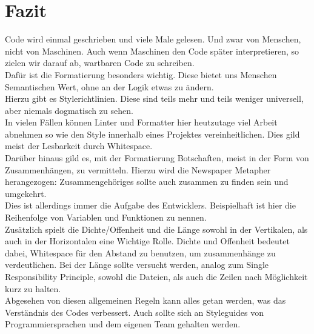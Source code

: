 \section{Fazit}
    Code wird einmal geschrieben und viele Male gelesen.
    Und zwar von Menschen, nicht von Maschinen.
    Auch wenn Maschinen den Code später interpretieren, so zielen wir darauf ab, wartbaren Code zu schreiben.\\
    Dafür ist die Formatierung besonders wichtig.
    Diese bietet uns Menschen Semantischen Wert, ohne an der Logik etwas zu ändern.\\
    Hierzu gibt es Stylerichtlinien.
    Diese sind teils mehr und teils weniger universell, aber niemals dogmatisch zu sehen.\\
    In vielen Fällen können Linter und Formatter hier heutzutage viel Arbeit abnehmen so wie den Style innerhalb eines Projektes vereinheitlichen.
    Dies gild meist der Lesbarkeit durch Whitespace.\\
    Darüber hinaus gild es, mit der Formatierung  Botschaften, meist in der Form von Zusammenhängen, zu vermitteln.
    Hierzu wird die Newspaper Metapher herangezogen: Zusammengehöriges sollte auch zusammen zu finden sein und umgekehrt.\\
    Dies ist allerdings immer die Aufgabe des Entwicklers.
    Beispielhaft ist hier die Reihenfolge von Variablen und Funktionen zu nennen.\\
    Zusätzlich spielt die Dichte/Offenheit und die Länge sowohl in der Vertikalen, als auch in der Horizontalen eine Wichtige Rolle.
    Dichte und Offenheit bedeutet dabei, Whitespace für den Abstand zu benutzen, um zusammenhänge zu verdeutlichen.
    Bei der Länge sollte versucht werden, analog zum Single Responsibility Principle, sowohl die Dateien, als auch die Zeilen nach Möglichkeit kurz zu halten.\\
    Abgesehen von diesen allgemeinen Regeln kann alles getan werden, was das Verständnis des Codes verbessert.
    Auch sollte sich an Styleguides von Programmiersprachen und dem eigenen Team gehalten werden.
